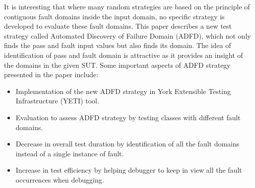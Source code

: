 \documentclass[runningheads,a4paper]{llncs}
\begin{document}


It is interesting that where many random strategies are based on the principle of contiguous fault domains inside the input domain, no specific strategy is developed to evaluate these fault domains. This paper describes a new test strategy called Automated Discovery of Failure Domain (ADFD), which not only finds the pass and fault input values but also finds its domain. The idea of identification of pass and fault domain is attractive as it provides an insight of the domains in the given SUT. Some important aspects of ADFD strategy presented in the paper include:

\begin{itemize}

\item Implementation of the new ADFD strategy in York Extensible Testing Infrastructure (YETI) tool.
\item Evaluation to assess ADFD strategy by testing classes with different fault domains.
\item Decrease in overall test duration by identification of all the fault domains instead of a single instance of fault.
\item Increase in test efficiency by helping debugger to keep in view all the fault occurrences when debugging. 

\end{itemize}
\end{document}
